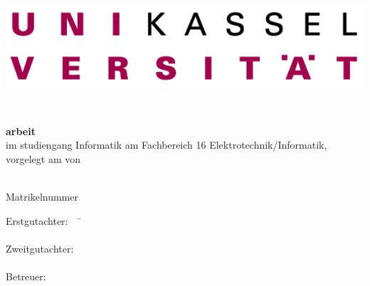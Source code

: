 
\begin{titlepage}
  \pagestyle{empty} %
  
  \begin{center}
    \includegraphics[width=0.4\linewidth]{stuff/title_page/logo-uni}
    
    \vspace{3.0cm}
    
    \huge {\textbf{\thesisTitle}} \\[5mm]
    \Large {\thesisSubTitle}
  \end{center}
  
  \vspace{3.5cm}
  
  \begin{flushleft}
    {\large\textbf{\thesiskind{}arbeit}}\\
    
    im \thesiskind{}studiengang Informatik am Fachbereich 16 Elektrotechnik/Informatik, vorgelegt am \deadline{} von
    
    \vspace{1.5cm}
    
    \textbf{\thesisauthor}\\
    Matrikelnummer \studentId
    
    \vspace{1.5cm}
    
    \begin{tabbing}
    Erstgutachter:~~ \= \firstReviewer\\
    \>\firstReviewerInstitution \\[5mm]
    Zweitgutachter: \> \secondReviewer \\
    \>\secondReviewerInstitution \\[5mm]
    Betreuer: \>\supervisor \\
              \>\supervisorInstitution
    \end{tabbing}
  \end{flushleft}
  
\end{titlepage}